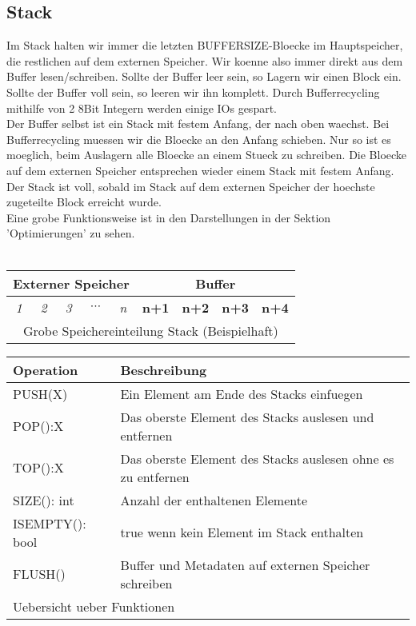 \documentclass[10pt,a4paper]{article}
\begin{document}
\subsection{Stack}
Im Stack halten wir immer die letzten BUFFERSIZE-Bloecke im Hauptspeicher, die restlichen auf dem externen Speicher. Wir koenne also immer direkt aus dem Buffer lesen/schreiben. Sollte der Buffer leer sein, so Lagern wir einen Block ein. Sollte der Buffer voll sein, so leeren wir ihn komplett. Durch Bufferrecycling mithilfe von 2 8Bit Integern werden einige IOs gespart. \\
Der Buffer selbst ist ein Stack mit festem Anfang, der nach oben waechst. Bei Bufferrecycling muessen wir die Bloecke an den Anfang schieben. Nur so ist es moeglich, beim Auslagern alle Bloecke an einem Stueck zu schreiben. Die Bloecke auf dem externen Speicher entsprechen wieder einem Stack mit festem Anfang. Der Stack ist voll, sobald im Stack auf dem externen Speicher der hoechste zugeteilte Block erreicht wurde.\\
Eine grobe Funktionsweise ist in den Darstellungen in der Sektion 'Optimierungen' zu sehen.\\
\\
\begin{tabular}{|| c | c | c | c | c || c | c | c | c ||}
\multicolumn{5}{c}{Externer Speicher} & \multicolumn{4}{c}{Buffer} \\
\hline
\it{1} & \it{2} & \it{3} & $\cdots$ & \it{n} & \bf{n+1} & \bf{n+2} & \bf{n+3} & \bf{n+4} \\
\hline
\multicolumn{9}{c}{Grobe Speichereinteilung Stack (Beispielhaft)}
\end{tabular}
\begin{center}


\begin{tabular}{|l|l|}
\hline
Operation & Beschreibung\\
\hline
PUSH(X) & Ein Element am Ende des Stacks einfuegen\\
POP():X & Das oberste Element des Stacks auslesen und entfernen\\
TOP():X & Das oberste Element des Stacks auslesen ohne es zu entfernen\\
SIZE(): int & Anzahl der enthaltenen Elemente\\
ISEMPTY(): bool & true wenn kein Element im Stack enthalten\\
FLUSH() & Buffer und Metadaten auf externen Speicher schreiben\\
\hline
\multicolumn{2}{l}{Uebersicht ueber Funktionen}
\end{tabular}
\end{center}
\end{document}
